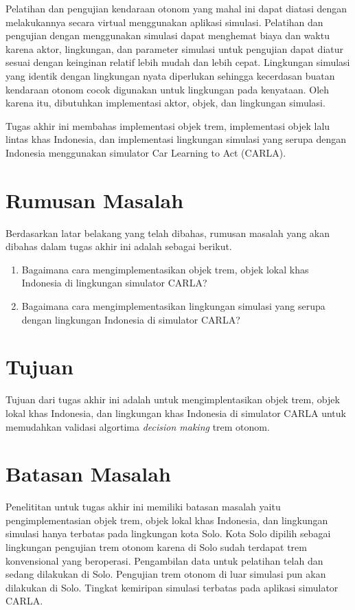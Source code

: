 Pelatihan dan pengujian kendaraan otonom yang mahal ini dapat diatasi dengan
melakukannya secara virtual menggunakan aplikasi simulasi. Pelatihan dan
pengujian dengan menggunakan simulasi dapat menghemat biaya dan waktu karena
aktor, lingkungan, dan parameter simulasi untuk pengujian dapat diatur sesuai
dengan keinginan relatif lebih mudah dan lebih cepat. Lingkungan simulasi yang
identik dengan lingkungan nyata diperlukan sehingga kecerdasan buatan kendaraan
otonom cocok digunakan untuk lingkungan pada kenyataan. Oleh karena itu,
dibutuhkan implementasi aktor, objek, dan lingkungan simulasi.

Tugas akhir ini membahas implementasi objek trem, implementasi objek lalu lintas
khas Indonesia, dan implementasi lingkungan simulasi yang serupa dengan
Indonesia menggunakan simulator Car Learning to Act (CARLA).

\section{Rumusan Masalah}

Berdasarkan latar belakang yang telah dibahas, rumusan masalah yang akan dibahas
dalam tugas akhir ini adalah sebagai berikut.
\begin{enumerate}
	\item Bagaimana cara mengimplementasikan objek trem, objek lokal khas
	Indonesia di lingkungan simulator CARLA?
	\item Bagaimana cara mengimplementasikan lingkungan simulasi yang serupa
	dengan lingkungan Indonesia di simulator CARLA?
\end{enumerate}

\section{Tujuan}

Tujuan dari tugas akhir ini adalah untuk mengimplentasikan objek trem, objek
lokal khas Indonesia, dan lingkungan khas Indonesia di simulator CARLA untuk
memudahkan validasi algortima \textit{decision making} trem otonom.

\section{Batasan Masalah}

Penelititan untuk tugas akhir ini memiliki batasan masalah yaitu
pengimplementasian objek trem, objek lokal khas Indonesia, dan lingkungan
simulasi hanya terbatas pada lingkungan kota Solo. Kota Solo dipilih sebagai
lingkungan pengujian trem otonom karena di Solo sudah terdapat trem konvensional
yang beroperasi. Pengambilan data untuk pelatihan telah dan sedang dilakukan di
Solo. Pengujian trem otonom di luar simulasi pun akan dilakukan di Solo.
Tingkat kemiripan simulasi terbatas pada aplikasi simulator CARLA.

